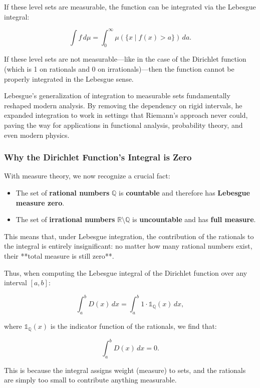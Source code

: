 \documentclass{article}
\begin{document}
If these level sets are measurable, the function can be integrated via the Lebesgue integral:

\[
\int f \, d\mu = \int_0^\infty \mu(\{ x \mid f(x) > a \}) \, da.
\]

If these level sets are not measurable—like in the case of the Dirichlet function (which is 1 on rationals and 0 on irrationals)—then the function cannot be properly integrated in the Lebesgue sense.

Lebesgue’s generalization of integration to measurable sets fundamentally reshaped modern analysis. By removing the dependency on rigid intervals, he expanded integration to work in settings that Riemann’s approach never could, paving the way for applications in functional analysis, probability theory, and even modern physics.

\subsubsection{Why the Dirichlet Function's Integral is Zero}

With measure theory, we now recognize a crucial fact:

\begin{itemize}
    \item The set of \textbf{rational numbers} \( \mathbb{Q} \) is \textbf{countable} and therefore has \textbf{Lebesgue measure zero}.
    \item The set of \textbf{irrational numbers} \( \mathbb{R} \setminus \mathbb{Q} \) is \textbf{uncountable} and has \textbf{full measure}.
\end{itemize}

This means that, under Lebesgue integration, the contribution of the rationals to the integral is entirely insignificant: no matter how many rational numbers exist, their **total measure is still zero**.

Thus, when computing the Lebesgue integral of the Dirichlet function over any interval \( [a, b] \):

\[
\int_a^b D(x) \,dx = \int_a^b 1 \cdot \mathbb{1}_{\mathbb{Q}}(x) \,dx,
\]

where \( \mathbb{1}_{\mathbb{Q}}(x) \) is the indicator function of the rationals, we find that:

\[
\int_a^b D(x) \,dx = 0.
\]

This is because the integral assigns weight (measure) to sets, and the rationals are simply too small to contribute anything measurable.
\end{document}
